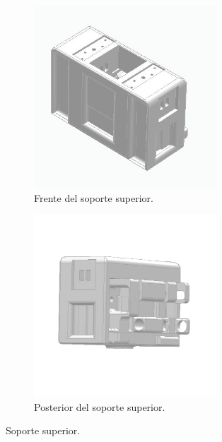 \begin{figure}[H]
    \centering
    \begin{subfigure}[b]{0.35\textwidth}
        \centering
        \includegraphics[width=0.75\textwidth]{img/Superior_frente.jpg}
        \caption{Frente del soporte superior.}
        \label{fig:izaje_desacoplado}
    \end{subfigure}
    \hspace{0.02\textwidth}
    \begin{subfigure}[b]{0.35\textwidth}
        \centering
        \includegraphics[width=0.75\textwidth]{img/superior_atras.jpg}
        \caption{Posterior del soporte superior.}
        \label{fig:izaje_acoplado}
    \end{subfigure}
     \caption{Soporte superior.}
    \label{fig:Superior_orginal}
\end{figure}

